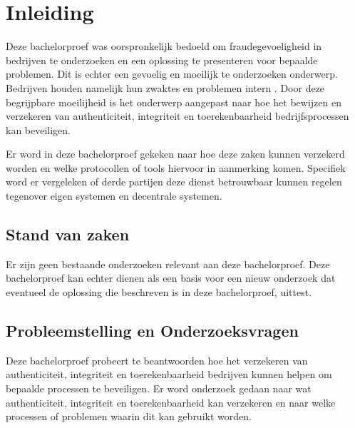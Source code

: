 
\chapter{Inleiding}
\label{ch:inleiding}

Deze bachelorproef was oorspronkelijk bedoeld om fraudegevoeligheid in bedrijven
te onderzoeken en een oplossing te presenteren voor bepaalde problemen. Dit is
echter een gevoelig en moeilijk te onderzoeken onderwerp. Bedrijven houden
namelijk hun zwaktes en problemen intern \autocite{EconomicCrimeSurvey}. Door
deze begrijpbare moeilijheid is het onderwerp aangepast naar hoe het bewijzen en
verzekeren van \gls{authenticiteit}, \gls{integriteit} en \gls{toerekenbaarheid}
bedrijfsprocessen
kan beveiligen.

Er word in deze bachelorproef gekeken naar hoe deze zaken kunnen verzekerd
worden en welke protocollen of tools hiervoor in aanmerking komen. Specifiek
word er vergeleken of derde partijen deze dienst betrouwbaar kunnen regelen
tegenover eigen systemen en decentrale systemen.

\section{Stand van zaken}
\label{sec:stand-van-zaken}
Er zijn geen bestaande onderzoeken relevant aan deze bachelorproef. Deze
bachelorproef kan echter dienen als een basis voor een nieuw onderzoek dat
eventueel de oplossing die beschreven is in deze bachelorproef, uittest.



\section{Probleemstelling en Onderzoeksvragen}
\label{sec:onderzoeksvragen}

Deze bachelorproef probeert te beantwoorden hoe het verzekeren van
\gls{authenticiteit}, \gls{integriteit} en \gls{toerekenbaarheid} bedrijven
kunnen helpen om
bepaalde processen te beveiligen. Er word onderzoek gedaan naar wat
\gls{authenticiteit}, \gls{integriteit} en \gls{toerekenbaarheid} kan verzekeren
en naar welke
processen of problemen waarin dit kan gebruikt worden.

